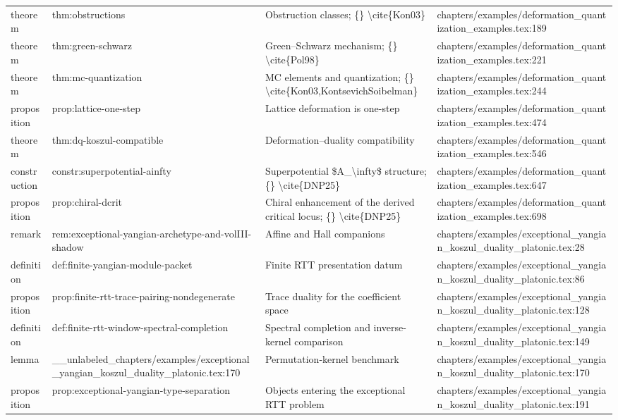 \documentclass[11pt]{article}
\begin{document}
\begin{longtable}{L{0.10\textwidth}L{0.26\textwidth}L{0.42\textwidth}L{0.22\textwidth}}
theorem & thm:obstructions & Obstruction classes; \{\} \textbackslash{}cite\{Kon03\} & chapters/examples/deformation\_quantization\_examples.tex:189\\
theorem & thm:green-schwarz & Green--Schwarz mechanism; \{\} \textbackslash{}cite\{Pol98\} & chapters/examples/deformation\_quantization\_examples.tex:221\\
theorem & thm:mc-quantization & MC elements and quantization; \{\} \textbackslash{}cite\{Kon03,KontsevichSoibelman\} & chapters/examples/deformation\_quantization\_examples.tex:244\\
proposition & prop:lattice-one-step & Lattice deformation is one-step & chapters/examples/deformation\_quantization\_examples.tex:474\\
theorem & thm:dq-koszul-compatible & Deformation--duality compatibility & chapters/examples/deformation\_quantization\_examples.tex:546\\
construction & constr:superpotential-ainfty & Superpotential \$A\_\textbackslash{}infty\$ structure; \{\} \textbackslash{}cite\{DNP25\} & chapters/examples/deformation\_quantization\_examples.tex:647\\
proposition & prop:chiral-dcrit & Chiral enhancement of the derived critical locus; \{\} \textbackslash{}cite\{DNP25\} & chapters/examples/deformation\_quantization\_examples.tex:698\\
remark & rem:exceptional-yangian-archetype-and-volIII-shadow & Affine and Hall companions & chapters/examples/exceptional\_yangian\_koszul\_duality\_platonic.tex:28\\
definition & def:finite-yangian-module-packet & Finite RTT presentation datum & chapters/examples/exceptional\_yangian\_koszul\_duality\_platonic.tex:86\\
proposition & prop:finite-rtt-trace-pairing-nondegenerate & Trace duality for the coefficient space & chapters/examples/exceptional\_yangian\_koszul\_duality\_platonic.tex:128\\
definition & def:finite-rtt-window-spectral-completion & Spectral completion and inverse-kernel comparison & chapters/examples/exceptional\_yangian\_koszul\_duality\_platonic.tex:149\\
lemma & \_\_unlabeled\_chapters/examples/exceptional\_yangian\_koszul\_duality\_platonic.tex:170 & Permutation-kernel benchmark & chapters/examples/exceptional\_yangian\_koszul\_duality\_platonic.tex:170\\
proposition & prop:exceptional-yangian-type-separation & Objects entering the exceptional RTT problem & chapters/examples/exceptional\_yangian\_koszul\_duality\_platonic.tex:191\\

\end{longtable}
\end{document}
